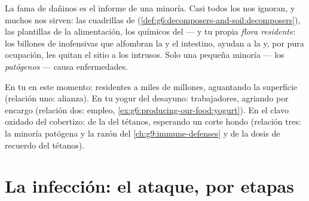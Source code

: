 \begin{proposition}\label{prop:g9:microbes-and-infection:mostly}
La fama de dañinos es el informe de una minoría. Casi todos los
 nos ignoran, y muchos nos sirven: las cuadrillas de
 (\cref{def:g6:decomposers-and-soil:decomposers}), las
plantillas de la alimentación, los químicos del  --- y tu propia
\emph{flora residente}: los billones de
 inofensivas que alfombran la  y el intestino, ayudan a la
 y, por pura ocupación, les quitan el sitio a los intrusos.
Solo una pequeña minoría --- los \emph{patógenos} ---
causa enfermedades.
\end{proposition}
\admitted

\begin{example}\label{ex:g9:microbes-and-infection:relations}
En tu  en este momento: residentes a miles de millones, aguantando
la superficie (relación uno: alianza). En tu yogur del desayuno:
trabajadores, agriando por encargo (relación dos: empleo,
\cref{ex:g6:producing-our-food:yogurt}). En el clavo oxidado del
cobertizo:  de la  del tétanos, esperando un corte hondo
(relación tres: la minoría patógena y la razón del
\cref{ch:g9:immune-defenses} y de la dosis de recuerdo del tétanos).
\end{example}

\section{La infección: el ataque, por etapas}

